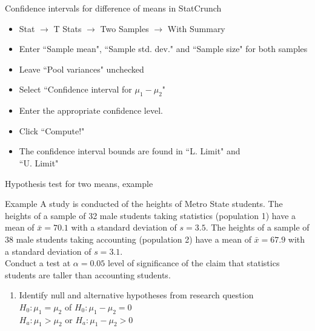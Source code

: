 \documentclass[xcolor=table, handout]{beamer}
\begin{document}
\begin{frame}{Confidence intervals for difference of means in StatCrunch}

\begin{block}{}
\large
\begin{itemize}
\item Stat $\to$ T Stats $\to$ Two Samples $\to$ With Summary
\item Enter ``Sample mean", ``Sample std. dev." and ``Sample size" for both samples
\item Leave ``Pool variances" unchecked
\item Select ``Confidence interval for $\mu_1 - \mu_2$"
\item Enter the appropriate confidence level.
\item Click ``Compute!"
\item The confidence interval bounds are found in ``L. Limit" and\\ ``U. Limit"
\end{itemize}
\end{block}

\end{frame}

\begin{frame}{Hypothesis test for two means, example}
\begin{exampleblock}{Example}
\large
A study is conducted of the heights of Metro State students. The heights of a sample of 32 male students taking statistics (population 1) have a mean of $\bar x = 70.1$ with a standard deviation of $s=3.5$. The heights of a sample of 38 male students taking accounting (population 2) have a mean of $\bar x = 67.9$ with a standard deviation of $s=3.1$.\\
\medskip
Conduct a test at $\alpha=0.05$ level of significance of the claim that statistics students are taller than accounting students.
\begin{enumerate}
\pause\item Identify null and alternative hypotheses from research question\\
\pause$H_0: \mu_1 = \mu_2$ of $H_0: \mu_1 - \mu_2 = 0$\\
$H_a: \mu_1 > \mu_2$ or $H_a: \mu_1 - \mu_2 > 0$\\
\end{enumerate}
\end{exampleblock}
\end{frame}
\end{document}
